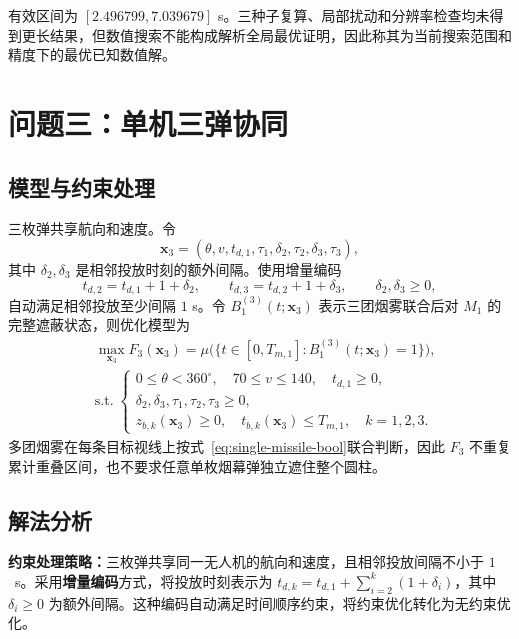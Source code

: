 \documentclass[12pt,a4paper]{article}
\begin{document}
有效区间为 $[2.496799,7.039679]$ s。三种子复算、局部扰动和分辨率检查均未得到更长结果，但数值搜索不能构成解析全局最优证明，因此称其为当前搜索范围和精度下的最优已知数值解。

\section{问题三：单机三弹协同}

\subsection{模型与约束处理}

三枚弹共享航向和速度。令
\begin{equation}
\boldsymbol x_3=(\theta,v,t_{d,1},\tau_1,\delta_2,\tau_2,\delta_3,\tau_3),
\end{equation}
其中 $\delta_2,\delta_3$ 是相邻投放时刻的额外间隔。使用增量编码
\begin{equation}
t_{d,2}=t_{d,1}+1+\delta_2,\qquad
t_{d,3}=t_{d,2}+1+\delta_3,\qquad \delta_2,\delta_3\ge0,
\end{equation}
自动满足相邻投放至少间隔 $1$ s。令 $B_1^{(3)}(t;\boldsymbol x_3)$ 表示三团烟雾联合后对 $M_1$ 的完整遮蔽状态，则优化模型为
\begin{equation}
\begin{aligned}
&\max_{\boldsymbol x_3} F_3(\boldsymbol x_3)
=\mu\bigl(\{t\in[0,T_{m,1}]:B_1^{(3)}(t;\boldsymbol x_3)=1\}\bigr), \\[6pt]
&\mathrm{s.t.}\; \left\{\begin{array}{l}
0\le\theta<360^\circ,\quad 70\le v\le140,\quad t_{d,1}\ge0, \\
\delta_2,\delta_3,\tau_1,\tau_2,\tau_3\ge0, \\
z_{b,k}(\boldsymbol x_3)\ge0,\quad t_{b,k}(\boldsymbol x_3)\le T_{m,1},\quad k=1,2,3.
\end{array}\right.
\end{aligned}
\label{eq:q3-model}
\end{equation}
多团烟雾在每条目标视线上按式~\eqref{eq:single-missile-bool}联合判断，因此 $F_3$ 不重复累计重叠区间，也不要求任意单枚烟幕弹独立遮住整个圆柱。

\subsection{解法分析}

\textbf{约束处理策略：}三枚弹共享同一无人机的航向和速度，且相邻投放间隔不小于 $1$~s。采用\textbf{增量编码}方式，将投放时刻表示为 $t_{d,k}=t_{d,1}+\sum_{i=2}^{k}(1+\delta_i)$，其中 $\delta_i\ge0$ 为额外间隔。这种编码自动满足时间顺序约束，将约束优化转化为无约束优化。
\end{document}
